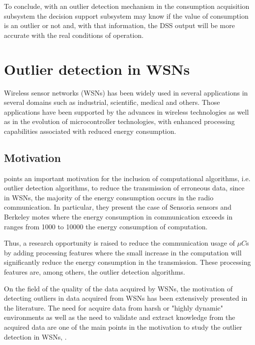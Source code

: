 To conclude, with an outlier detection mechanism in the consumption acquisition subsystem the decision support subsystem may know if the value of consumption is an outlier or not and, with that information, the DSS output will be more accurate with the real conditions of operation.

\newpage
\section{Outlier detection in WSNs}
\label{sec:od_wsn}
Wireless sensor networks (WSNs) has been widely used in several applications in several domains such as industrial, scientific, medical and others. Those applications have been supported by the advances in wireless technologies as well as in the evolution of microcontroller technologies, with enhanced processing capabilities associated with reduced energy consumption.

\subsection{Motivation}

\cite{class:rajasegarar:2007} points an important motivation for the inclusion of computational algorithms, i.e. outlier detection algorithms, to reduce the transmission of erroneous data, since in WSNs, the majority of the energy consumption occurs in the radio communication. In particular, they present the case of Sensoria sensors and Berkeley motes where the energy consumption in communication exceeds in ranges from 1000 to 10000 the energy consumption of computation.

Thus, a research opportunity is raised to reduce the communication usage of $\mu C$s by adding processing features where the small increase in the computation will significantly reduce the energy consumption in the transmission. These processing features are, among others, the outlier detection algorithms.


On the field of the quality of the data acquired by WSNs, the motivation of detecting outliers in data acquired from WSNs has been extensively presented in the literature. The need for acquire data from harsh or "highly dynamic" environments as well as the need to validate and extract knowledge from the acquired data are one of the main points in the motivation to study the outlier detection in WSNs,  \cite{gen:zhang:2010,gen:chandola:2009,stat:ghorbel:2015,class:martins:2015b}.



